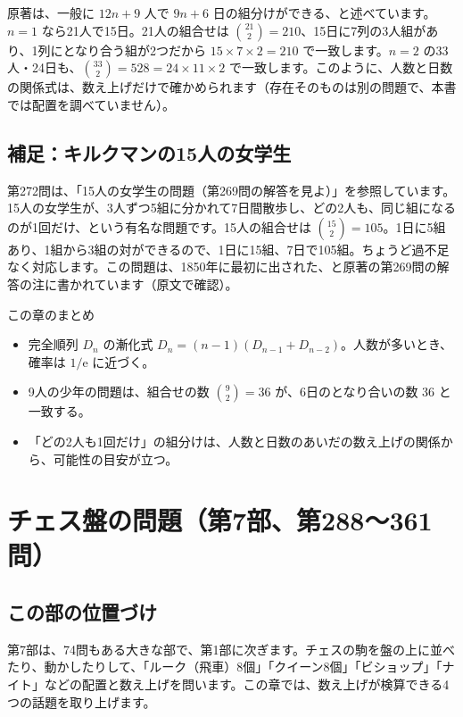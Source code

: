 \documentclass[a4paper,11pt,openany]{ltjsbook}
\newcommand{\ee}{\mathrm{e}}
\begin{document}
原著は、一般に $12n+9$ 人で $9n+6$ 日の組分けができる、と述べています。$n=1$ なら21人で15日。21人の組合せは $\binom{21}{2}=210$、15日に7列の3人組があり、1列にとなり合う組が2つだから $15\times7\times2=210$ で一致します。$n=2$ の33人・24日も、$\binom{33}{2}=528=24\times11\times2$ で一致します。このように、人数と日数の関係式は、数え上げだけで確かめられます（存在そのものは別の問題で、本書では配置を調べていません）。

\section{補足：キルクマンの15人の女学生}

第272問は、「15人の女学生の問題（第269問の解答を見よ）」を参照しています。15人の女学生が、3人ずつ5組に分かれて7日間散歩し、どの2人も、同じ組になるのが1回だけ、という有名な問題です。15人の組合せは $\binom{15}{2}=105$。1日に5組あり、1組から3組の対ができるので、1日に15組、7日で105組。ちょうど過不足なく対応します。この問題は、1850年に最初に出された、と原著の第269問の解答の注に書かれています（原文で確認）。

\begin{pointbox}{この章のまとめ}
\begin{itemize}[leftmargin=*]
\item 完全順列 $D_n$ の漸化式 $D_n=(n-1)(D_{n-1}+D_{n-2})$。人数が多いとき、確率は $1/\ee$ に近づく。
\item 9人の少年の問題は、組合せの数 $\binom92=36$ が、6日のとなり合いの数 36 と一致する。
\item 「どの2人も1回だけ」の組分けは、人数と日数のあいだの数え上げの関係から、可能性の目安が立つ。
\end{itemize}
\end{pointbox}

\chapter{チェス盤の問題（第7部、第288〜361問）}

\section{この部の位置づけ}

第7部は、74問もある大きな部で、第1部に次ぎます。チェスの駒を盤の上に並べたり、動かしたりして、「ルーク（飛車）8個」「クイーン8個」「ビショップ」「ナイト」などの配置と数え上げを問います。この章では、数え上げが検算できる4つの話題を取り上げます。
\end{document}
